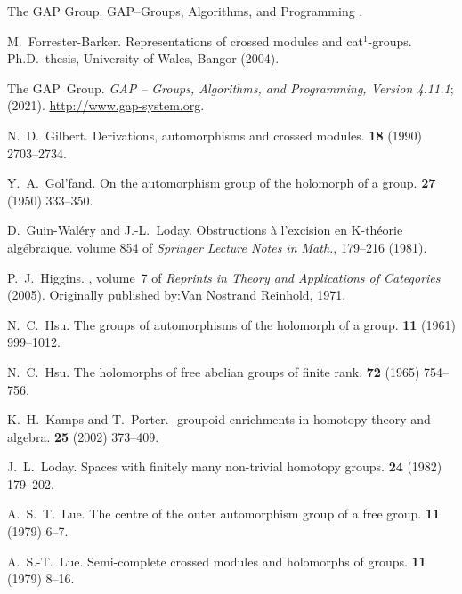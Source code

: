 \begin{thebibliography}{notes}
The GAP Group.
\newblock GAP--Groups, Algorithms, and Programming .

M.~Forrester-Barker.
\newblock Representations of crossed modules and cat$^1$-groups.
\newblock Ph.{D}.~thesis, University of Wales, Bangor (2004).

The GAP~Group.
\emph{GAP -- Groups, Algorithms, and Programming, Version 4.11.1}; (2021).
\newline\urlprefix\url{http://www.gap-system.org}. 

N.~D.~Gilbert.
\newblock Derivations, automorphisms and crossed modules.
 {\bf 18} (1990) 2703--2734.

Y.~A.~Gol'fand.
\newblock On the automorphism group of the holomorph of a group.
 {\bf 27} (1950) 333--350.

D.~Guin-Wal\'ery and J.-L.~Loday.
\newblock Obstructions \`a l'excision en K-th\'eorie alg\'ebraique.
\newblock volume 854 of {\em Springer Lecture Notes in Math.\/}, 179--216
  (1981).

P.~J.~Higgins.
, volume~7 of {\em Reprints in Theory
  and Applications of Categories\/} (2005).
\newblock Originally published by:Van Nostrand Reinhold, 1971.

N.~C.~Hsu.
\newblock The groups of automorphisms of the holomorph of a group.
 {\bf 11} (1961) 999--1012.

N.~C.~Hsu.
\newblock The holomorphs of free abelian groups of finite rank.
 {\bf 72} (1965) 754--756.

K.~H.~Kamps and T.~Porter.
-groupoid enrichments in homotopy theory and algebra.
 {\bf 25} (2002) 373--409.

J.~L.~Loday.
\newblock Spaces with finitely many non-trivial homotopy groups.
 {\bf 24} (1982) 179--202.

A.~S.~T.~Lue.
\newblock The centre of the outer automorphism group of a free group.
 {\bf 11} (1979) 6--7.

A.~S.-T.~Lue.
\newblock Semi-complete crossed modules and holomorphs of groups.
 {\bf 11} (1979) 8--16.


\end{thebibliography}
